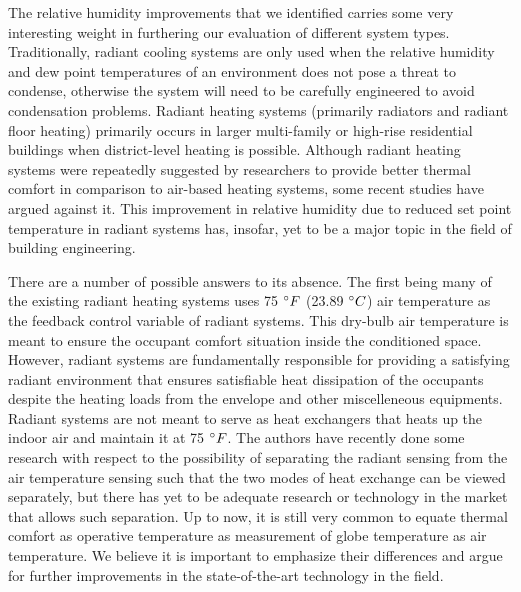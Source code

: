 The relative humidity improvements that we identified carries some very interesting weight in furthering our evaluation of different system types. Traditionally, radiant cooling systems are only used when the relative humidity and dew point temperatures of an environment does not pose a threat to condense, otherwise the system will need to be carefully engineered to avoid condensation problems. Radiant heating systems (primarily radiators and radiant floor heating) primarily occurs in larger multi-family or high-rise residential buildings when district-level heating is possible. Although radiant heating systems were repeatedly suggested by researchers to provide better thermal comfort in comparison to air-based heating systems, some recent studies have argued against it. This improvement in relative humidity due to reduced set point temperature in radiant systems has, insofar, yet to be a major topic in the field of building engineering.

There are a number of possible answers to its absence. The first being many of the existing radiant heating systems uses 75 $\degree F$ (23.89 $\degree C$) air temperature as the feedback control variable of radiant systems. This dry-bulb air temperature is meant to ensure the occupant comfort situation inside the conditioned space. However, radiant systems are fundamentally responsible for providing a satisfying radiant environment that ensures satisfiable heat dissipation of the occupants despite the heating loads from the envelope and other miscelleneous equipments. Radiant systems are not meant to serve as heat exchangers that heats up the indoor air and maintain it at 75 $\degree F$. The authors have recently done some research with respect to the possibility of separating the radiant sensing from the air temperature sensing such that the two modes of heat exchange can be viewed separately, but there has yet to be adequate research or technology in the market that allows such separation. Up to now, it is still very common to equate thermal comfort as operative temperature as measurement of globe temperature as air temperature. We believe it is important to emphasize their differences and argue for further improvements in the state-of-the-art technology in the field.
